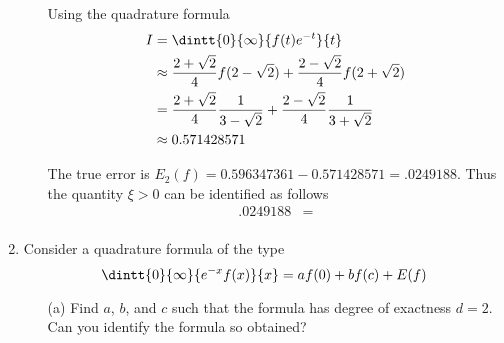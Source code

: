 \documentclass[11pt]{article}
\begin{document}
\begin{enumerate}
\begin{enumerate}
                Using the quadrature formula
                \begin{align*}
                    I &= \dintt{0}{\infty}{f(t) e^{-t}}{t} \\
                    &\approx \frac{2 + \sqrt{2}}{4} f(2 - \sqrt{2}) +
                        \frac{2 - \sqrt{2}}{4} f(2 + \sqrt{2}) \\
                    &= \frac{2 + \sqrt{2}}{4} \frac{1}{3 - \sqrt{2}} +
                        \frac{2 - \sqrt{2}}{4} \frac{1}{3 + \sqrt{2}} \\
                    &\approx 0.571428571
                \end{align*}


                The true error is $E_2(f) = 0.596347361 - 0.571428571 = .0249188$.
                Thus the quantity $\xi > 0$ can be identified as follows
                \begin{align*}
                    .0249188 &=  \\
                \end{align*}
        \end{enumerate}

    \item %
        Consider a quadrature formula of the type
        \[
            \dintt{0}{\infty}{e^{-x} f(x)}{x} = a f(0) + b f(c) + E(f)
        \]
        \begin{enumerate}
            \item[(a)] %
                Find $a$, $b$, and $c$ such that the formula has degree
                of exactness $d = 2$.
                Can you identify the formula so obtained?


\end{enumerate}
\end{enumerate}
\end{document}
